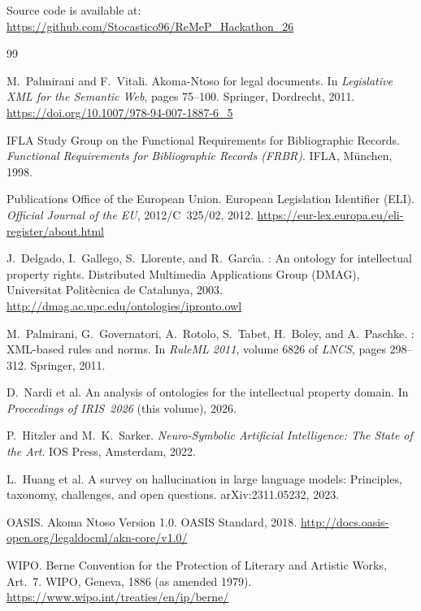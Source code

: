 \documentclass[12pt,a4paper]{article}
\begin{document}
Source code is available at:
\url{https://github.com/Stocastico96/ReMeP_Hackathon_26}

\newpage
\begin{thebibliography}{99}

M.~Palmirani and F.~Vitali.
\newblock Akoma-Ntoso for legal documents.
\newblock In \emph{Legislative XML for the Semantic Web}, pages 75--100.
  Springer, Dordrecht, 2011.
\newblock \url{https://doi.org/10.1007/978-94-007-1887-6_5}

IFLA Study Group on the Functional Requirements for Bibliographic Records.
\newblock \emph{Functional Requirements for Bibliographic Records (FRBR)}.
\newblock IFLA, M\"{u}nchen, 1998.

Publications Office of the European Union.
\newblock European Legislation Identifier (ELI).
\newblock \emph{Official Journal of the EU}, 2012/C~325/02, 2012.
\newblock \url{https://eur-lex.europa.eu/eli-register/about.html}

J.~Delgado, I.~Gallego, S.~Llorente, and R.~Garc\'{\i}a.
: An ontology for intellectual property rights.
\newblock Distributed Multimedia Applications Group (DMAG), Universitat
  Polit\`{e}cnica de Catalunya, 2003.
\newblock \url{http://dmag.ac.upc.edu/ontologies/ipronto.owl}

M.~Palmirani, G.~Governatori, A.~Rotolo, S.~Tabet, H.~Boley, and A.~Paschke.
: {XML}-based rules and norms.
\newblock In \emph{RuleML 2011}, volume 6826 of \emph{LNCS}, pages 298--312.
  Springer, 2011.

D.~Nardi et al.
\newblock An analysis of ontologies for the intellectual property domain.
\newblock In \emph{Proceedings of IRIS~2026} (this volume), 2026.

P.~Hitzler and M.~K.~Sarker.
\newblock \emph{Neuro-Symbolic Artificial Intelligence: The State of the Art}.
\newblock IOS Press, Amsterdam, 2022.

L.~Huang et al.
\newblock A survey on hallucination in large language models: Principles,
  taxonomy, challenges, and open questions.
\newblock arXiv:2311.05232, 2023.

OASIS.
\newblock Akoma Ntoso Version 1.0.
\newblock OASIS Standard, 2018.
\newblock \url{http://docs.oasis-open.org/legaldocml/akn-core/v1.0/}

WIPO.
\newblock Berne Convention for the Protection of Literary and Artistic Works,
  Art.~7.
\newblock WIPO, Geneva, 1886 (as amended 1979).
\newblock \url{https://www.wipo.int/treaties/en/ip/berne/}

\end{thebibliography}
\end{document}
